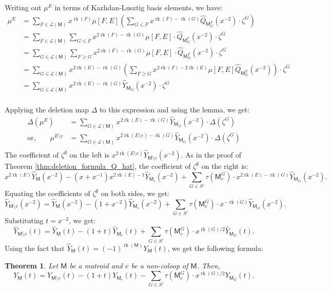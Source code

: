 \documentclass[11pt, a4paper, english]{amsart}
\theoremstyle{teoremas}
\newtheorem{theorem}{Theorem}[section]
\theoremstyle{definition}
\DeclareMathOperator{\rk}{rk}
\newcommand{\M}{\mathsf{M}}
\begin{document}
Writing out $\mu^E$ in terms of Kazhdan-Lusztig basis elements, we have:
\begin{align*}
    \mu^E & = \sum_{F \in \mathcal{L}(\M)} x^{\rk(F)}\mu[F,E]\left( \sum_{G \leq F} x^{\rk(F)-\rk(G)}\hat{Q}_{\M_G^F}(x^{-2}) \cdot \zeta^G \right)         \\
          & = \sum_{F \in \mathcal{L}(\M)} \sum_{G \leq F} x^{2\rk(F)-\rk(G)}\mu[F,E]\cdot\hat{Q}_{\M_G^F}(x^{-2}) \cdot \zeta^G                            \\
          & = \sum_{G \in \mathcal{L}(\M)} \sum_{F \geq G} x^{2\rk(F)-\rk(G)}\mu[F,E]\cdot\hat{Q}_{\M_G^F}(x^{-2}) \cdot \zeta^G                            \\
          & = \sum_{G \in \mathcal{L}(\M)} x^{2\rk(E)-\rk(G)}\left(\sum_{F \geq G} x^{2\rk(F)-2\rk(E)}\mu[F,E]\hat{Q}_{\M_G^F}(x^{-2})\right) \cdot \zeta^G \\
          & = \sum_{G \in \mathcal{L}(\M)} x^{2\rk(E)-\rk(G)}\hat{Y}_{\M_G}(x^{-2}) \cdot \zeta^G                                                           \\
\end{align*}

Applying the deletion map $\Delta$ to this expression and using the lemma, we get:
\begin{align*}
    \Delta(\mu^E)                      & = \sum_{G \in \mathcal{L}(\M)} x^{2\rk(E)-\rk(G)}\hat{Y}_{\M_G}(x^{-2}) \cdot \Delta(\zeta^G)            \\
    \text{or,}\qquad\mu^{E\setminus e} & = \sum_{G \in \mathcal{L}(\M)} x^{2\rk(E\setminus e)-\rk(G)}\hat{Y}_{\M_G}(x^{-2}) \cdot \Delta(\zeta^G) \\
\end{align*}
The coefficient of $\zeta^\emptyset$ on the left is $x^{2\rk(E\setminus e)}\hat{Y}_{\M\setminus e}(x^{-2})$.
As in the proof of Theorem \ref{thm:deletion_formula_Q_hat}, the coefficient of $\zeta^\emptyset$ on the right is:
\[
    x^{2\rk(E)}\hat{Y}_{\M}(x^{-2}) - (x+x^{-1})x^{2\rk(E)-1}\hat{Y}_{\M_e}(x^{-2}) +
    \sum_{G \in S'} \tau(\M^G_e)\cdot x^{2\rk(E)-\rk(G)}\hat{Y}_{\M_G}(x^{-2}).
\]
Equating the coefficients of $\zeta^\emptyset$ on both sides, we get:
\[
    \hat{Y}_{\M\setminus e}(x^{-2}) = \hat{Y}_{\M}(x^{-2}) - (1+x^{-2})\hat{Y}_{\M_e}(x^{-2}) +
    \sum_{G \in S'} \tau(\M^G_e)\cdot x^{-\rk(G)}\hat{Y}_{\M_G}(x^{-2}).
\]
Substituting $t = x^{-2}$, we get:
\[
    \hat{Y}_{\M\setminus e}(t) = \hat{Y}_{\M}(t) - (1+t)\hat{Y}_{\M_e}(t) +
    \sum_{G \in S'} \tau(\M^G_e)\cdot x^{\rk(G)/2}\hat{Y}_{\M_G}(t).
\]
Using the fact that $\hat{Y}_{\M}(t) = (-1)^{\rk(\M)}Y_{\M}(t)$, we get the following formula:
\begin{theorem}
    Let $\M$ be a matroid and $e$ be a non-coloop of $\M$. Then,
    \[
        Y_{\M}(t) = Y_{\M\setminus e}(t) - (1+t)Y_{\M_e}(t) -
        \sum_{G \in S'} \tau(\M^G_e)\cdot x^{\rk(G)/2}Y_{\M_G}(t).
    \]

\end{theorem}
\end{document}
